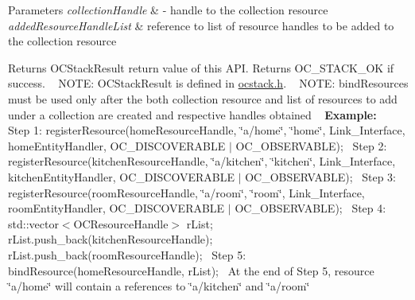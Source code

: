 \begin{DoxyParams}{Parameters}
{\em collection\+Handle} & -\/ handle to the collection resource \\
\hline
{\em added\+Resource\+Handle\+List} & reference to list of resource handles to be added to the collection resource\\
\hline
\end{DoxyParams}
\begin{DoxyReturn}{Returns}
O\+C\+Stack\+Result return value of this A\+P\+I. Returns O\+C\+\_\+\+S\+T\+A\+C\+K\+\_\+\+O\+K if success. ~\newline
 N\+O\+T\+E\+: O\+C\+Stack\+Result is defined in \hyperlink{ocstack_8h_source}{ocstack.\+h}. ~\newline
 N\+O\+T\+E\+: bind\+Resources must be used only after the both collection resource and list of resources to add under a collection are created and respective handles obtained ~\newline
 {\bfseries  Example\+: } ~\newline
 Step 1\+: register\+Resource(home\+Resource\+Handle, \char`\"{}a/home\char`\"{}, \char`\"{}home\char`\"{}, Link\+\_\+\+Interface, home\+Entity\+Handler, O\+C\+\_\+\+D\+I\+S\+C\+O\+V\+E\+R\+A\+B\+L\+E $\vert$ O\+C\+\_\+\+O\+B\+S\+E\+R\+V\+A\+B\+L\+E);~\newline
 Step 2\+: register\+Resource(kitchen\+Resource\+Handle, \char`\"{}a/kitchen\char`\"{}, \char`\"{}kitchen\char`\"{}, Link\+\_\+\+Interface, kitchen\+Entity\+Handler, O\+C\+\_\+\+D\+I\+S\+C\+O\+V\+E\+R\+A\+B\+L\+E $\vert$ O\+C\+\_\+\+O\+B\+S\+E\+R\+V\+A\+B\+L\+E);~\newline
 Step 3\+: register\+Resource(room\+Resource\+Handle, \char`\"{}a/room\char`\"{}, \char`\"{}room\char`\"{}, Link\+\_\+\+Interface, room\+Entity\+Handler, O\+C\+\_\+\+D\+I\+S\+C\+O\+V\+E\+R\+A\+B\+L\+E $\vert$ O\+C\+\_\+\+O\+B\+S\+E\+R\+V\+A\+B\+L\+E);~\newline
 Step 4\+: std\+::vector$<$\+O\+C\+Resource\+Handle$>$ r\+List; r\+List.\+push\+\_\+back(kitchen\+Resource\+Handle); r\+List.\+push\+\_\+back(room\+Resource\+Handle);~\newline
 Step 5\+: bind\+Resource(home\+Resource\+Handle, r\+List);~\newline
 At the end of Step 5, resource \char`\"{}a/home\char`\"{} will contain a references to \char`\"{}a/kitchen\char`\"{} and \char`\"{}a/room\char`\"{} ~\newline
 
\end{DoxyReturn}
\hypertarget{classOC_1_1OCPlatform_a3a7f2658df5b17be3641dd3646aa5af8}{}
